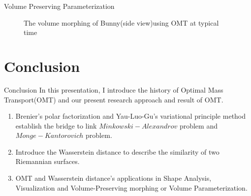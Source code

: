 \documentclass{beamer}
\theoremstyle{definition}
\begin{document}
\begin{frame}{Volume Preserving Parameterization}
\begin{figure}
\centering
{}
\caption{The volume morphing of Bunny(side view)using OMT at typical time}
\label{fig:gu_morph}
\end{figure}
\end{frame}

\section{Conclusion}



\begin{frame}{Conclusion}
In this presentation, I introduce the history of Optimal Mass Transport(OMT) and our present research approach and result of OMT. 

\begin{enumerate}

\item Brenier's polar factorization\cite{brenier1991polar} and Yau-Luo-Gu's\cite{gu2013variational} variational principle method establish the bridge to link  $ Minkowski-Alexandrov $ problem and $ Monge-Kantorovich $ problem.

\item Introduce the Wasserstein distance to describe the similarity of two Riemannian surfaces. 

\item  OMT and Wasserstein distance's applications in Shape Analysis, Visualization and Volume-Preserving morphing or Volume Parameterization.

\end{enumerate}


\end{frame}
\end{document}

